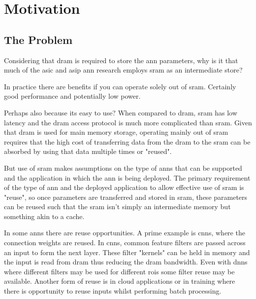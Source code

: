



\chapter{Motivation}
\label{Motivation}


\section[The Problem]{The Problem}
\label{sec:The Problem}

\iffalse
Given the bandwidth and storage requirements shown in table \ref{tab:Bandwidth and Storage Design Requirements}, the problem becomes \hyphenquote{american}{\textbf{\textcolor{black}{to provide deterministic at or near real-time performance within tolerable power and space constraints for edge systems employing inference on multiple disparate useful-sized neural networks.}}}
\fi

Considering that \ac{dram} is required to store the \ac{ann} parameters, why is it that much of the \ac{asic} and \ac{asip} \ac{ann} research employs \ac{sram} as an intermediate store? 

In practice there are benefits if you can operate solely out of \ac{sram}.
Certainly good performance and potentially low power.

Perhaps also because its easy to use? 
When compared to \ac{dram}, \ac{sram} has low latency and the \ac{dram} access protocol is much more complicated than \ac{sram}. 
Given that \ac{dram} is used for main memory storage, operating mainly out of \ac{sram} requires that the high cost of transferring data from the \ac{dram} to the \ac{sram} can be absorbed by using that data multiple times or "reused".

But use of \ac{sram} makes assumptions on the type of \acp{ann} that can be supported and the application in which the \ac{ann} is being deployed.
The primary requirement of the type of \ac{ann} and the deployed application to allow effective use of \ac{sram} is "reuse", so once parameters are transferred and stored in \ac{sram}, these parameters can be reused such that the \ac{sram} isn't simply an intermediate memory but something akin to a cache.

In some \ac{ann}s there are reuse opportunities. 
A prime example is \acp{cnn}, where the connection weights are reused. In \acp{cnn}, common feature filters are passed across an input to form the next layer. 
These filter "kernels" can be held in memory and the input is read from \ac{dram} thus reducing the \ac{dram} bandwidth.
Even with \ac{dnn}s where different filters may be used for different \acp{roi} some filter reuse may be available.
Another form of reuse is in cloud applications or in training where there is opportunity to reuse inputs whilst performing batch processing.

